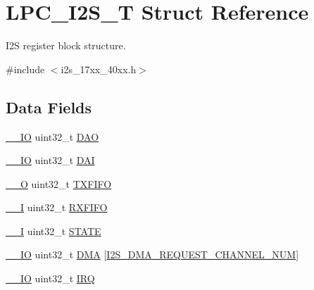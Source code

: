 \hypertarget{structLPC__I2S__T}{\section{L\-P\-C\-\_\-\-I2\-S\-\_\-\-T Struct Reference}
\label{structLPC__I2S__T}
}


I2\-S register block structure.  




{\ttfamily \#include $<$i2s\-\_\-17xx\-\_\-40xx.\-h$>$}

\subsection*{Data Fields}
\begin{DoxyCompactItemize}
\item 
\hyperlink{core__cm3_8h_aec43007d9998a0a0e01faede4133d6be}{\-\_\-\-\_\-\-I\-O} uint32\-\_\-t \hyperlink{structLPC__I2S__T_ad574a0e2f1cdec634e05ee8176c0450e}{D\-A\-O}
\item 
\hyperlink{core__cm3_8h_aec43007d9998a0a0e01faede4133d6be}{\-\_\-\-\_\-\-I\-O} uint32\-\_\-t \hyperlink{structLPC__I2S__T_ab94e2f49e7d70f8b19c3d74f2e67878e}{D\-A\-I}
\item 
\hyperlink{core__cm3_8h_a7e25d9380f9ef903923964322e71f2f6}{\-\_\-\-\_\-\-O} uint32\-\_\-t \hyperlink{structLPC__I2S__T_aa3a381d218c4342917885fa3a51e82d8}{T\-X\-F\-I\-F\-O}
\item 
\hyperlink{core__cm3_8h_af63697ed9952cc71e1225efe205f6cd3}{\-\_\-\-\_\-\-I} uint32\-\_\-t \hyperlink{structLPC__I2S__T_aac5c44248c1354eb4320eb5fa5b18baa}{R\-X\-F\-I\-F\-O}
\item 
\hyperlink{core__cm3_8h_af63697ed9952cc71e1225efe205f6cd3}{\-\_\-\-\_\-\-I} uint32\-\_\-t \hyperlink{structLPC__I2S__T_a35299409c86d4860e936a7ff3e5603bf}{S\-T\-A\-T\-E}
\item 
\hyperlink{core__cm3_8h_aec43007d9998a0a0e01faede4133d6be}{\-\_\-\-\_\-\-I\-O} uint32\-\_\-t \hyperlink{structLPC__I2S__T_a2259283a5ad23aa09617861948df25d7}{D\-M\-A} \mbox{[}\hyperlink{group__I2S__17XX__40XX_ggac04c1583101ddd661886d9677683421bab9921186ab93fee889b2074d508b88ce}{I2\-S\-\_\-\-D\-M\-A\-\_\-\-R\-E\-Q\-U\-E\-S\-T\-\_\-\-C\-H\-A\-N\-N\-E\-L\-\_\-\-N\-U\-M}\mbox{]}
\item 
\hyperlink{core__cm3_8h_aec43007d9998a0a0e01faede4133d6be}{\-\_\-\-\_\-\-I\-O} uint32\-\_\-t \hyperlink{structLPC__I2S__T_a0ed73323cb1c577293f1416c6c55c47f}{I\-R\-Q}
\item 

\end{DoxyCompactItemize}

